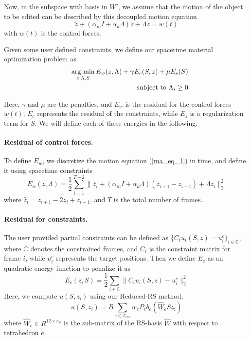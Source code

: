 \documentclass[9pt,twocolumn]{extarticle}
\newcommand{\argmin}{\operatornamewithlimits{arg\ min}}
\begin{document}
Now, in the subspace with basis in $W'$, we assume that the motion of the object
to be edited can be described by this decoupled motion equation
\begin{equation} \label{ma_eq_1}
  \ddot{z} + (\alpha_mI+\alpha_k\Lambda)\dot{z} + \Lambda{z} = w(t)
\end{equation}
with $w(t)$ is the control forces.

Given some user defined constraints, we define our spacetime material
optimization problem as
\begin{eqnarray}\label{mtl-opt}
  &&\argmin_{z,\Lambda,S} E_w(z,\Lambda)+\gamma E_c(S,z)+\mu E_s(S)\\
  &&\mbox {subject to } \Lambda_i \ge 0
\end{eqnarray}

Here, $\gamma$ and $\mu$ are the penalties, and $E_w$ is the residual for the
control forces $w(t)$, $E_c$ represents the residual of the constraints, while
$E_s$ is a regularization term for $S$. We will define each of these energies in
the following. 

\paragraph{Residual of control forces.} To define $E_w$, we discretize the
motion equation (\ref{ma_eq_1}) in time, and define it using spacetime
constraints
\begin{equation} \label{ew}
  E_w(z,\Lambda) = \frac{1}{2}\sum_{i=1}^{T-2}\|\hat{z}_i+(\alpha_mI+\alpha_k\Lambda)(z_{i+1}-z_{i-1})+\Lambda z_i\|_2^2
\end{equation}
where $\hat{z}_i=z_{i+1}-2z_{i}+z_{i-1}$, and $T$ is the total number of frames.

\paragraph{Residual for constraints. } The user provided partial constraints can
be defined as $\{C_iu_i(S,z)=u^c_i\}_{i\in \mathbb{C}}$, where $\mathbb{C}$
denotes the constrained frames, and $C_i$ is the constraint matrix for frame
$i$, while $u^c_i$ represents the target positions. Then we define $E_c$ as an
quadratic energy function to penalize it as
\begin{equation} \label{ec}
  E_c(z,S) = \frac{1}{2}\sum_{i\in \mathbb{C}}\|C_iu_i(S,z)-u^c_i\|_2^2
\end{equation}
Here, we compute $u(S,z_i)$ using our Reduced-RS method,
\begin{equation} \label{redrs_s}
  u(S,z_i) = B\sum_{e\in T_{cub}}w_eP_eb_e(\hat{W}_eSz_i)
\end{equation}
where $\hat{W}_e\in R^{12\times r_w}$ is the sub-matrix of the RS-basis
$\hat{W}$ with respect to tetrahedron $e$. 
\end{document}

